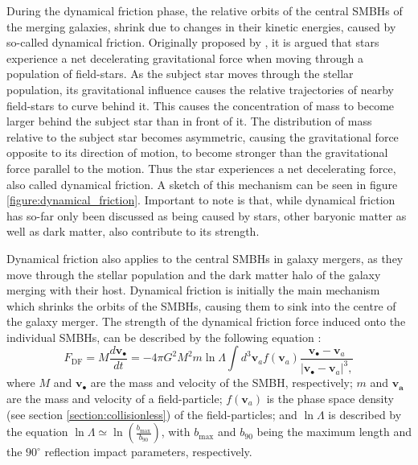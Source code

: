\documentclass[english, twoside]{HYgradu}
\begin{document}
During the dynamical friction phase, the relative orbits of the central SMBHs of the merging galaxies, shrink due to changes in their kinetic energies, caused by so-called dynamical friction. Originally proposed by \cite{Chandrasekhar1943}, it is argued that stars experience a net decelerating gravitational force when moving through a population of field-stars. As the subject star moves through the stellar population, its gravitational influence causes the relative trajectories of nearby field-stars to curve behind it. This causes the concentration of mass to become larger behind the subject star than in front of it. The distribution of mass relative to the subject star becomes asymmetric, causing the gravitational force opposite to its direction of motion, to become stronger than the gravitational force parallel to the motion. Thus the star experiences a net decelerating force, also called dynamical friction. A sketch of this mechanism can be seen in figure \ref{figure:dynamical_friction}. Important to note is that, while dynamical friction has so-far only been discussed as being caused by stars, other baryonic matter as well as dark matter, also contribute to its strength.

Dynamical friction also applies to the central SMBHs in galaxy mergers, as they move through the stellar population and the dark matter halo of the galaxy merging with their host. Dynamical friction is initially the main mechanism which shrinks the orbits of the SMBHs, causing them to sink into the centre of the galaxy merger. The strength of the dynamical friction force induced onto the individual SMBHs, can be described by the following equation \citep{BinneyTremaine}:
\begin{equation}
F_\mathrm{DF} = M\frac{d\mathbf{v_\bullet}}{dt} = -4\pi G^2 M^2 m \ln \Lambda \int d^3 \mathbf{v}_a f(\mathbf{v}_a) \frac{\mathbf{v_\bullet}-\mathbf{v}_a}{|\mathbf{v_\bullet}-\mathbf{v}_a|^3,} \label{eq:dynamical_friction}
\end{equation}
where $M$ and $\mathbf{v_\bullet}$ are the mass and velocity of the SMBH, respectively; $m$ and $\mathbf{v_a}$ are the mass and velocity of a field-particle; $f\left(\mathbf{v}_a\right)$ is the phase space density (see section \ref{section:collisionless}) of the field-particles; and $\ln \Lambda$ is described by the equation $\ln \Lambda \simeq \ln \left( \frac{b_\mathrm{max}}{b_{90}} \right)$, with $b_\mathrm{max}$ and $b_{90}$ being the maximum length and the $90^\circ$ reflection impact parameters, respectively.
\end{document}
